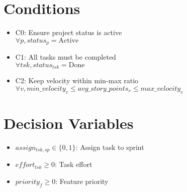 \documentclass{article}
\begin{document}
\section{Conditions}
\begin{itemize}
    \item C0: Ensure project status is active \\
          $\forall p, status_p = \text{Active}$
    \item C1: All tasks must be completed \\
          $\forall tsk, status_{tsk} = \text{Done}$
    \item C2: Keep velocity within min-max ratio \\
          $\forall v, min\_velocity_v \leq avg\_story\_points_v \leq max\_velocity_v$
\end{itemize}

\section{Decision Variables}
\begin{itemize}
    \item $assign_{tsk,sp} \in \{0,1\}$: Assign task to sprint
    \item $effort_{tsk} \geq 0$: Task effort
    \item $priority_f \geq 0$: Feature priority
\end{itemize}
\end{document}
